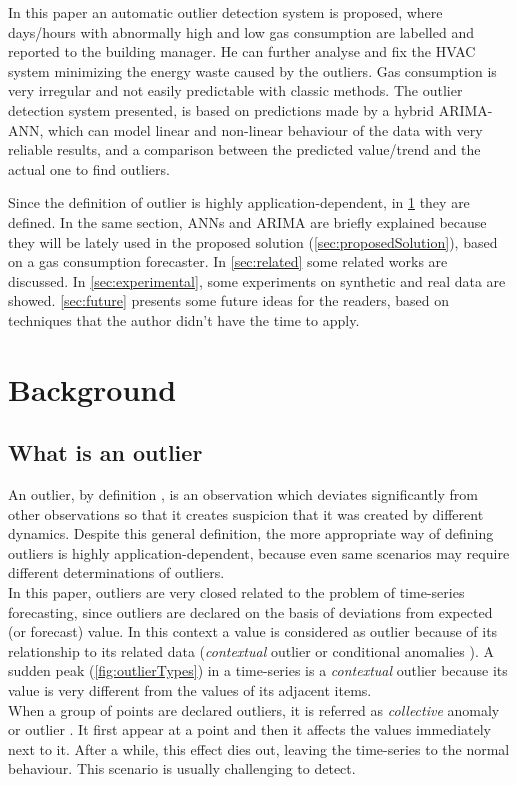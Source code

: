 \documentclass{sig-alternate-sigmod07}
\begin{document}
In this paper an automatic outlier detection system is proposed, where days/hours with abnormally high and low gas consumption are labelled and reported to the building manager. He can further analyse and fix the HVAC system minimizing the energy waste caused by the outliers. Gas consumption is very irregular and not easily predictable with classic methods. The outlier detection system presented, is based on predictions made by a hybrid ARIMA-ANN, which can model linear and non-linear behaviour of the data with very reliable results, and a comparison between the predicted value/trend and the actual one to find outliers. 

Since the definition of outlier is highly application-dependent, in \cref{sec:background} they are defined. In the same section, ANNs and ARIMA are briefly explained because they will be lately used in the proposed solution (\cref{sec:proposedSolution}), based on a gas consumption forecaster. In \cref{sec:related} some related works are discussed. In \cref{sec:experimental}, some experiments on synthetic and real data are showed. \cref{sec:future} presents some future ideas for the readers, based on techniques that the author didn't have the time to apply.


\section{Background}
\label{sec:background}

\subsection{What is an outlier}
An outlier, by definition \cite{hawkins1980identification}, is an observation which deviates significantly from other observations so that it creates suspicion that it was created by different dynamics. Despite this general definition, the more appropriate way of defining outliers is highly application-dependent, because even same scenarios may require different determinations of outliers. \\
In this paper, outliers are very closed related to the problem of time-series forecasting, since outliers are declared on the basis of deviations from expected (or forecast) value. In this context a value is considered as outlier because of its relationship to its related data (\emph{contextual} outlier \cite{aggarwal2013outlier} or conditional anomalies \cite{song2007conditional}). A sudden peak (\cref{fig:outlierTypes}) in a time-series is a \emph{contextual} outlier because its value is very different from the values of its adjacent items.\\
When a group of points are declared outliers, it is referred as \emph{collective} anomaly or outlier \cite{aggarwal2013outlier}. It first appear at a point and then it affects the values immediately next to it. After a while, this effect dies out, leaving the time-series to the normal behaviour. This scenario is usually challenging to detect.
\end{document}
